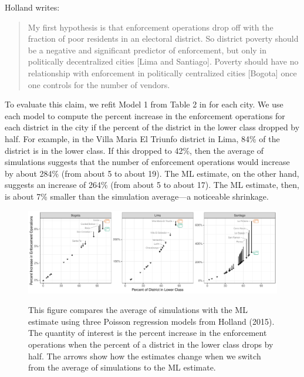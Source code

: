 \documentclass[11pt]{article}
\begin{document}
Holland writes: 
\begin{quote}
My first hypothesis is that enforcement operations drop off with the fraction of poor residents in an electoral district. So district poverty should be a negative and significant predictor of enforcement, but only in politically decentralized cities [Lima and Santiago]. Poverty should have no relationship with enforcement in politically centralized cities [Bogota] once one controls for the number of vendors.
\end{quote}

To evaluate this claim, we refit Model 1 from Table 2 in \cite{Holland2015} for each city. We use each model to compute the percent increase in the enforcement operations for each district in the city if the percent of the district in the lower class dropped by half. For example, in the Villa Maria El Triunfo district in Lima, 84\% of the district is in the lower class. If this dropped to 42\%, then the average of simulations suggests that the number of enforcement operations would increase by about 284\% (from about 5 to about 19). The ML estimate, on the other hand, suggests an increase of 264\% (from about 5 to about 17). The ML estimate, then, is about 7\% smaller than the simulation average---a noticeable shrinkage. 

\begin{figure}[h]
\begin{center}
\includegraphics[width=\textwidth]{figs/holland.pdf}\\
\vspace{.1in}
\caption{This figure compares the average of simulations with the ML estimate using three Poisson regression models from Holland (2015). The quantity of interest is the percent increase in the enforcement operations when the percent of a district in the lower class drops by half. The arrows show how the estimates change when we switch from the average of simulations to the ML estimate.}\label{fig:holland}
\end{center}
\end{figure}
\end{document}
